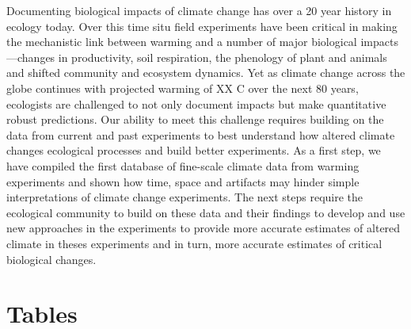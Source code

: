 \documentclass{article}
\begin{document}
\par Documenting biological impacts of climate change has over a 20 year history in ecology today. Over this time situ field experiments have been critical in making the mechanistic link between warming and a number of major biological impacts---changes in productivity, soil respiration, the phenology of plant and animals and shifted community and ecosystem dynamics. Yet as climate change across the globe continues with projected warming of XX C over the next 80 years, ecologists are challenged to not only document impacts but make quantitative robust predictions. Our ability to meet this challenge requires building on the data from current and past experiments to best understand how altered climate changes ecological processes and build better experiments. As a first step, we have compiled the first database of fine-scale climate data from warming experiments and shown how time, space and artifacts may hinder simple interpretations of climate change experiments. The next steps require the ecological community to build on these data and their findings to develop and use new approaches in the experiments to provide more accurate estimates of altered climate in theses experiments and in turn, more accurate estimates of critical biological changes. 


\clearpage
\section* {Tables}

\end{document}
